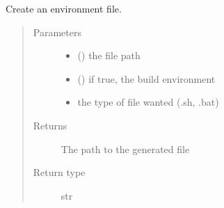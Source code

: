 \documentclass[a4paper,10pt,english]{sphinxmanual}
\begin{document}
\begin{fulllineitems}
\begin{fulllineitems}
\begin{quote}
\begin{description}
\begin{itemize}
\end{itemize}

\end{description}\end{quote}

\end{fulllineitems}


\begin{fulllineitems}
\label{\detokenize{commands/apidoc/src:src.environment.FileEnvWriter.write_env_file}}
Create an environment file.
\begin{quote}\begin{description}
\item[{Parameters}] \leavevmode\begin{itemize}
\item {} 
 () \textendash{} the file path

\item {} 
 () \textendash{} if true, the build environment

\item {} 
 \textendash{} the type of file wanted (.sh, .bat)

\end{itemize}

\item[{Returns}] \leavevmode
The path to the generated file

\item[{Return type}] \leavevmode
str

\end{description}\end{quote}

\end{fulllineitems}


\end{fulllineitems}

\end{document}
